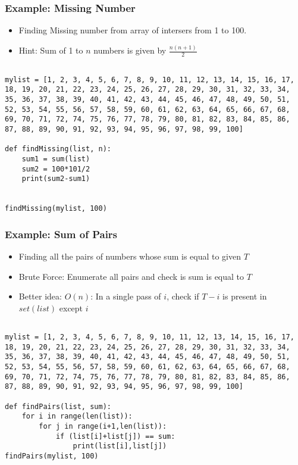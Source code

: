 \begin{frame}[fragile]
	\frametitle{Example: Missing Number}
	\begin{itemize}
		\item Finding Missing number from array of intersers from 1 to 100.
		\item Hint: Sum of 1 to $n$ numbers is given by $\frac{n(n+1)}{2}$
	\end{itemize}
	
\begin{lstlisting}

mylist = [1, 2, 3, 4, 5, 6, 7, 8, 9, 10, 11, 12, 13, 14, 15, 16, 17, 18, 19, 20, 21, 22, 23, 24, 25, 26, 27, 28, 29, 30, 31, 32, 33, 34, 35, 36, 37, 38, 39, 40, 41, 42, 43, 44, 45, 46, 47, 48, 49, 50, 51, 52, 53, 54, 55, 56, 57, 58, 59, 60, 61, 62, 63, 64, 65, 66, 67, 68, 69, 70, 71, 72, 74, 75, 76, 77, 78, 79, 80, 81, 82, 83, 84, 85, 86, 87, 88, 89, 90, 91, 92, 93, 94, 95, 96, 97, 98, 99, 100]

def findMissing(list, n):
    sum1 = sum(list)
    sum2 = 100*101/2
    print(sum2-sum1)


findMissing(mylist, 100)
\end{lstlisting}

\end{frame}

\begin{frame}[fragile]
	\frametitle{Example: Sum of Pairs}
	\begin{itemize}
		\item Finding all the pairs of numbers whose sum is equal to given $T$
		\item Brute Force: Enumerate all pairs and check is sum is equal to $T$
		\item Better idea: $O(n)$: In a single pass of $i$, check if $T-i$ is present in $set(list)$ except $i$
	\end{itemize}
	
\begin{lstlisting}

mylist = [1, 2, 3, 4, 5, 6, 7, 8, 9, 10, 11, 12, 13, 14, 15, 16, 17, 18, 19, 20, 21, 22, 23, 24, 25, 26, 27, 28, 29, 30, 31, 32, 33, 34, 35, 36, 37, 38, 39, 40, 41, 42, 43, 44, 45, 46, 47, 48, 49, 50, 51, 52, 53, 54, 55, 56, 57, 58, 59, 60, 61, 62, 63, 64, 65, 66, 67, 68, 69, 70, 71, 72, 74, 75, 76, 77, 78, 79, 80, 81, 82, 83, 84, 85, 86, 87, 88, 89, 90, 91, 92, 93, 94, 95, 96, 97, 98, 99, 100]

def findPairs(list, sum):
    for i in range(len(list)):
        for j in range(i+1,len(list)):
            if (list[i]+list[j]) == sum:
                print(list[i],list[j])
findPairs(mylist, 100)
\end{lstlisting}

\end{frame}

